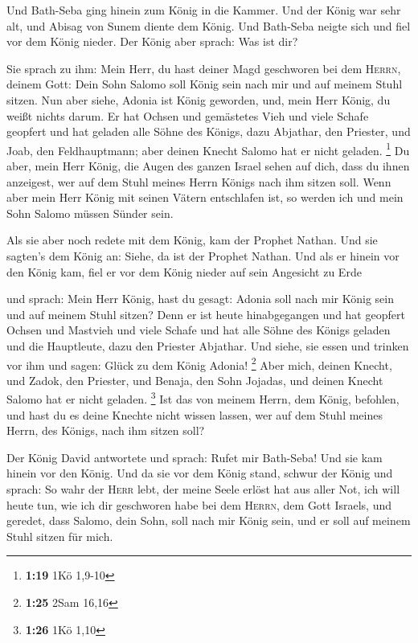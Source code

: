  Und Bath-Seba ging hinein zum König in die Kammer. Und
der König war sehr alt, und Abisag von Sunem diente dem König.
 Und Bath-Seba neigte sich und fiel vor dem König nieder.
Der König aber sprach: Was ist dir?

 Sie sprach zu ihm: Mein Herr, du hast deiner Magd
geschworen bei dem \textsc{Herrn}, deinem Gott: Dein Sohn Salomo soll
König sein nach mir und auf meinem Stuhl sitzen.  Nun
aber siehe, Adonia ist König geworden, und, mein Herr König, du weißt
nichts darum.  Er hat Ochsen und gemästetes Vieh und
viele Schafe geopfert und hat geladen alle Söhne des Königs, dazu
Abjathar, den Priester, und Joab, den Feldhauptmann; aber deinen Knecht
Salomo hat er nicht geladen. \footnote{\textbf{1:19} 1Kö 1,9-10}
 Du aber, mein Herr König, die Augen des ganzen Israel
sehen auf dich, dass du ihnen anzeigest, wer auf dem Stuhl meines Herrn
Königs nach ihm sitzen soll.  Wenn aber mein Herr König
mit seinen Vätern entschlafen ist, so werden ich und mein Sohn Salomo
müssen Sünder sein.

 Als sie aber noch redete mit dem König, kam der Prophet
Nathan.  Und sie sagten's dem König an: Siehe, da ist der
Prophet Nathan. Und als er hinein vor den König kam, fiel er vor dem
König nieder auf sein Angesicht zu Erde

 und sprach: Mein Herr König, hast du gesagt: Adonia soll
nach mir König sein und auf meinem Stuhl sitzen?  Denn er
ist heute hinabgegangen und hat geopfert Ochsen und Mastvieh und viele
Schafe und hat alle Söhne des Königs geladen und die Hauptleute, dazu
den Priester Abjathar. Und siehe, sie essen und trinken vor ihm und
sagen: Glück zu dem König Adonia! \footnote{\textbf{1:25} 2Sam 16,16}
 Aber mich, deinen Knecht, und Zadok, den Priester, und
Benaja, den Sohn Jojadas, und deinen Knecht Salomo hat er nicht geladen.
\footnote{\textbf{1:26} 1Kö 1,10}  Ist das von meinem
Herrn, dem König, befohlen, und hast du es deine Knechte nicht wissen
lassen, wer auf dem Stuhl meines Herrn, des Königs, nach ihm sitzen
soll?

 Der König David antwortete und sprach: Rufet mir
Bath-Seba! Und sie kam hinein vor den König. Und da sie vor dem König
stand,  schwur der König und sprach: So wahr der
\textsc{Herr} lebt, der meine Seele erlöst hat aus aller Not,
 ich will heute tun, wie ich dir geschworen habe bei dem
\textsc{Herrn}, dem Gott Israels, und geredet, dass Salomo, dein Sohn,
soll nach mir König sein, und er soll auf meinem Stuhl sitzen für mich.

